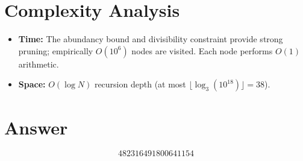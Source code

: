 \documentclass[12pt]{article}
\begin{document}
\section{Complexity Analysis}

\begin{itemize}
\item \textbf{Time:} The abundancy bound and divisibility constraint provide strong pruning; empirically $O(10^6)$ nodes are visited. Each node performs $O(1)$ arithmetic.
\item \textbf{Space:} $O(\log N)$ recursion depth (at most $\lfloor\log_3(10^{18})\rfloor=38$).
\end{itemize}

\section{Answer}

\[
\boxed{482316491800641154}
\]
\end{document}
